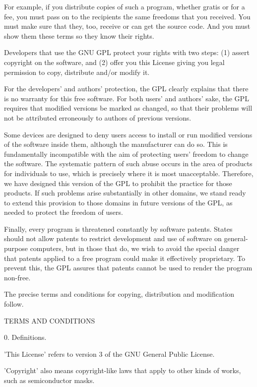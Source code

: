 \documentclass{article}
\begin{document}
  For example, if you distribute copies of such a program, whether
gratis or for a fee, you must pass on to the recipients the same
freedoms that you received.  You must make sure that they, too, receive
or can get the source code.  And you must show them these terms so they
know their rights.

  Developers that use the GNU GPL protect your rights with two steps:
(1) assert copyright on the software, and (2) offer you this License
giving you legal permission to copy, distribute and/or modify it.

  For the developers' and authors' protection, the GPL clearly explains
that there is no warranty for this free software.  For both users' and
authors' sake, the GPL requires that modified versions be marked as
changed, so that their problems will not be attributed erroneously to
authors of previous versions.

  Some devices are designed to deny users access to install or run
modified versions of the software inside them, although the manufacturer
can do so.  This is fundamentally incompatible with the aim of
protecting users' freedom to change the software.  The systematic
pattern of such abuse occurs in the area of products for individuals to
use, which is precisely where it is most unacceptable.  Therefore, we
have designed this version of the GPL to prohibit the practice for those
products.  If such problems arise substantially in other domains, we
stand ready to extend this provision to those domains in future versions
of the GPL, as needed to protect the freedom of users.

  Finally, every program is threatened constantly by software patents.
States should not allow patents to restrict development and use of
software on general-purpose computers, but in those that do, we wish to
avoid the special danger that patents applied to a free program could
make it effectively proprietary.  To prevent this, the GPL assures that
patents cannot be used to render the program non-free.

  The precise terms and conditions for copying, distribution and
modification follow.

                       TERMS AND CONDITIONS

  0. Definitions.

  'This License' refers to version 3 of the GNU General Public License.

  'Copyright' also means copyright-like laws that apply to other kinds of
works, such as semiconductor masks.
\end{document}

